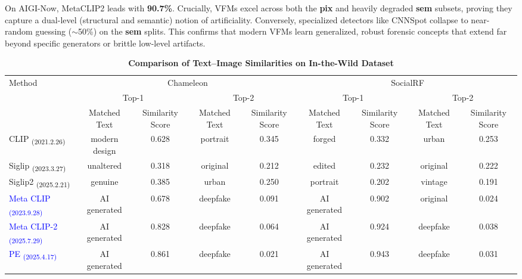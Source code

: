 \documentclass[sigconf,screen]{acmart}
\theoremstyle{plain}
\theoremstyle{definition}
\theoremstyle{remark}
\begin{document}
On AIGI-Now, MetaCLIP2 leads with \textbf{90.7\%}. Crucially, VFMs excel across both the \textbf{pix} and heavily degraded \textbf{sem} subsets, proving they capture a dual-level (structural and semantic) notion of artificiality. Conversely, specialized detectors like CNNSpot collapse to near-random guessing ($\sim$50\%) on the \textbf{sem} splits. This confirms that modern VFMs learn generalized, robust forensic concepts that extend far beyond specific generators or brittle low-level artifacts.
\begin{table}[th!]
\centering
\caption{\textbf{Comparison of Text--Image Similarities on In-the-Wild Dataset}}
\label{tab:textimgmatch}
\begin{adjustbox}{width=0.95\linewidth}
  \begin{tabular}{l|cccccccc}
  \toprule
  \multirow{3}{*}{Method} & \multicolumn{4}{c}{Chameleon}& \multicolumn{4}{c}{SocialRF}\\
  \cmidrule(r){2-5} \cmidrule(r){6-9}
   & \multicolumn{2}{c}{Top-1} & \multicolumn{2}{c}{Top-2} & \multicolumn{2}{c}{Top-1} & \multicolumn{2}{c}{Top-2} \\
   \cmidrule(r){2-3} \cmidrule(r){4-5} \cmidrule{6-7} \cmidrule{8-9}
   &Matched Text& Similarity Score&Matched Text& Similarity Score&Matched Text& Similarity Score&Matched Text& Similarity Score\\
  \midrule

    CLIP \textsubscript{(2021.2.26)} &modern design&0.628&portrait&0.345&forged&0.332&urban&0.253\\

  Siglip \textsubscript{(2023.3.27)}&unaltered&0.318&original&0.212&edited&0.232&original&0.222\\
  Siglip2 \textsubscript{(2025.2.21)}&genuine&0.385&urban&0.250&portrait&0.202&vintage&0.191\\
  \textcolor{blue}{Meta CLIP} \textsubscript{\textcolor{blue}{(2023.9.28)}}&AI generated&0.678&deepfake&0.091&AI generated&0.902&original&0.024\\
  \textcolor{blue}{Meta CLIP-2} \textsubscript{\textcolor{blue}{(2025.7.29)}} &AI generated&0.828&deepfake&0.064&AI generated&0.924&deepfake&0.038\\
  \textcolor{blue}{PE} \textsubscript{\textcolor{blue}{(2025.4.17)}}&AI generated&0.861&deepfake&0.021&AI generated&0.943&deepfake&0.031\\


\end{tabular}
\end{adjustbox}
\end{table}
\end{document}
